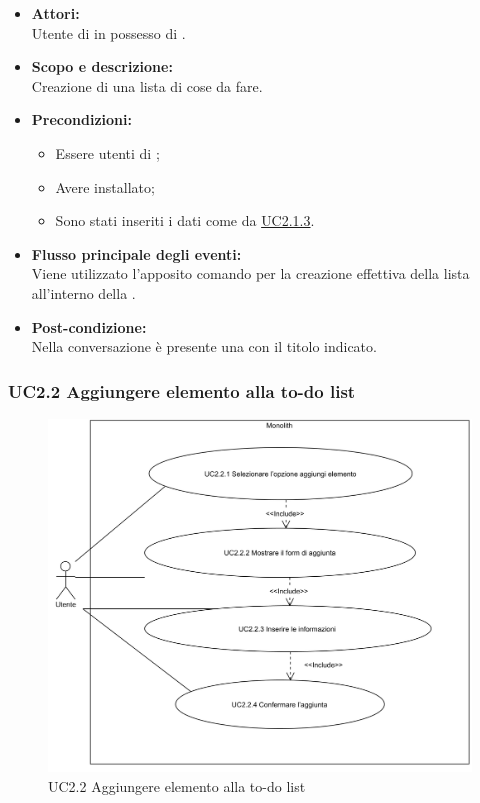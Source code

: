 \begin{itemize}
	\item \textbf{Attori:}
	\\Utente di  in possesso di \ProjectName{}.
	\item \textbf{Scopo e descrizione:} 
	\\Creazione di una lista di cose da fare.
	\item \textbf{Precondizioni:}
	\begin{itemize}
		\item Essere utenti di ;
		\item Avere \ProjectName{} installato;
		\item Sono stati inseriti i dati come da \hyperref[UC2.1.3]{UC2.1.3}.
	\end{itemize}
	\item \textbf{Flusso principale degli eventi:}
	\\Viene utilizzato l'apposito comando per la creazione effettiva della lista all'interno della .
	\item \textbf{Post-condizione:}
	\\Nella conversazione è presente una   con il titolo indicato. 
\end{itemize}

\subsubsection{UC2.2 Aggiungere elemento alla to-do list} \label{UC2.2}

\begin{figure}[H]
	\centering
	\includegraphics[width=15cm]{../../documenti/AnalisiDeiRequisiti/Diagrammi_img/uc2_2.png}
	\caption{UC2.2 Aggiungere elemento alla to-do list}
\end{figure}

